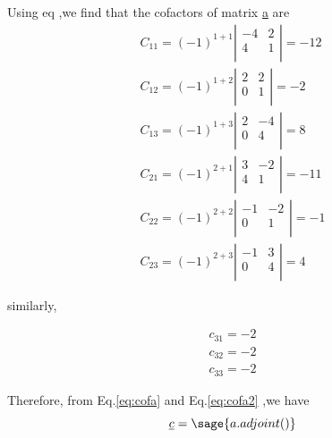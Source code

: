 \documentclass[12pt]{report}
\newcommand{\lab}[1]{
	Eq.\ref{#1}
}
\begin{document}
Using eq ,we find that the cofactors of matrix \underline{a} are 
\begin{eqnarray}
	  C_{11} = (-1)^{1+1} \left|\begin{array}{rr} -4 &  2 \\4 & 1\\ \end{array}\right| = -12 \nonumber 
	\\C_{12} = (-1)^{1+2} \left|\begin{array}{rr}  2 &  2 \\0 & 1\\ \end{array}\right| =  -2 \nonumber 
	\\C_{13} = (-1)^{1+3} \left|\begin{array}{rr}  2 & -4 \\0 & 4\\ \end{array}\right| =   8 \nonumber 
	\\C_{21} = (-1)^{2+1} \left|\begin{array}{rr}  3 & -2 \\4 & 1\\ \end{array}\right| = -11 \nonumber 
	\\C_{22} = (-1)^{2+2} \left|\begin{array}{rr} -1 & -2 \\0 & 1\\ \end{array}\right| =  -1 \nonumber 
	\\C_{23} = (-1)^{2+3} \left|\begin{array}{rr} -1 &  3 \\0 & 4\\ \end{array}\right| =   4 
\label{eq:cofa}
\end{eqnarray} 
 
similarly,

\begin{eqnarray} 
	c_{31} = -2 \nonumber \\ 
	c_{32} = -2 \nonumber \\
	c_{33} = -2 
	\label{eq:cofa2}
\end{eqnarray}

Therefore, from \lab{eq:cofa} and \lab{eq:cofa2} ,we have 
\begin{equation} 
	\underline{c} = \sage{a.adjoint()}
\end{equation}
\end{document}
